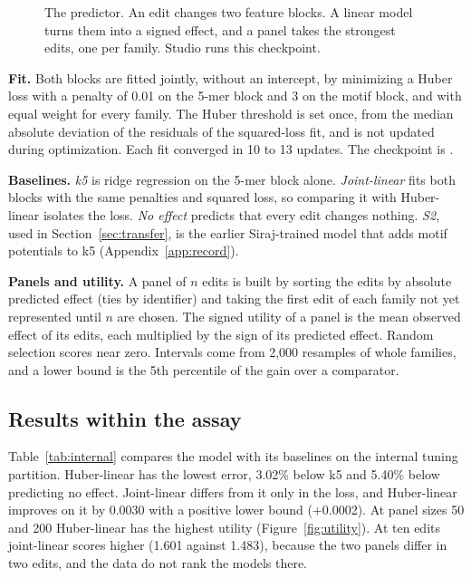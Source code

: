 \documentclass[10.5pt,a4paper]{article}
\begin{document}
\begin{figure}[htb]
\centering
{}
\caption{The predictor. An edit changes two feature blocks. A linear model turns them into a signed effect, and a panel takes the strongest edits, one per family. Studio runs this checkpoint.}\label{fig:pipeline}
\end{figure}

\textbf{Fit.} Both blocks are fitted jointly, without an intercept, by minimizing a Huber loss \citep{huber1964} with a penalty of 0.01 on the 5-mer block and 3 on the motif block, and with equal weight for every family. The Huber threshold is set once, from the median absolute deviation of the residuals of the squared-loss fit, and is not updated during optimization. Each fit converged in 10 to 13 updates. The checkpoint is .

\textbf{Baselines.} \emph{k5} is ridge regression on the 5-mer block alone. \emph{Joint-linear} fits both blocks with the same penalties and squared loss, so comparing it with Huber-linear isolates the loss. \emph{No effect} predicts that every edit changes nothing. \emph{S2}, used in Section~\ref{sec:transfer}, is the earlier Siraj-trained model that adds motif potentials to k5 (Appendix~\ref{app:record}).

\textbf{Panels and utility.} A panel of $n$ edits is built by sorting the edits by absolute predicted effect (ties by identifier) and taking the first edit of each family not yet represented until $n$ are chosen. The signed utility of a panel is the mean observed effect of its edits, each multiplied by the sign of its predicted effect. Random selection scores near zero. Intervals come from 2,000 resamples of whole families, and a lower bound is the 5th percentile of the gain over a comparator.

\subsection{Results within the assay}\label{sec:internal}

Table~\ref{tab:internal} compares the model with its baselines on the internal tuning partition. Huber-linear has the lowest error, 3.02\% below k5 and 5.40\% below predicting no effect. Joint-linear differs from it only in the loss, and Huber-linear improves on it by 0.0030 with a positive lower bound (+0.0002). At panel sizes 50 and 200 Huber-linear has the highest utility (Figure~\ref{fig:utility}). At ten edits joint-linear scores higher (1.601 against 1.483), because the two panels differ in two edits, and the data do not rank the models there.
\end{document}
